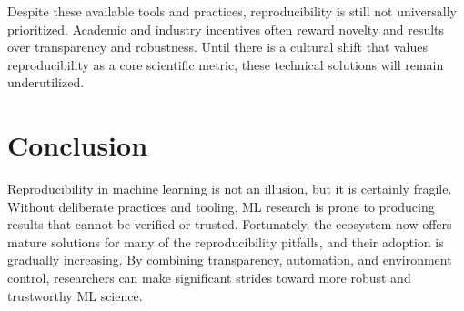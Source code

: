 \documentclass[11pt]{article}
\begin{document}
Despite these available tools and practices, reproducibility is still not universally prioritized. 
%
Academic and industry incentives often reward novelty and results over transparency and robustness. 
%
Until there is a cultural shift that values reproducibility as a core scientific metric, 
 these technical solutions will remain underutilized.

\section{Conclusion}
\label{sec:conclusion}
Reproducibility in machine learning is not an illusion, but it is certainly fragile. Without deliberate practices and tooling, ML research is prone to producing results that cannot be verified or trusted. Fortunately, the ecosystem now offers mature solutions for many of the reproducibility pitfalls, and their adoption is gradually increasing. By combining transparency, automation, and environment control, researchers can make significant strides toward more robust and trustworthy ML science.

% 

\end{document}
